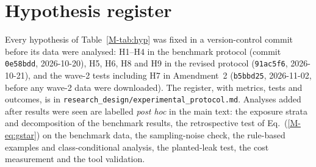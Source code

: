 \documentclass[11pt]{article}
\begin{document}
\section{Hypothesis register}\label{sec:register}
Every hypothesis of Table~\ref{M-tab:hyp} was fixed in a version-control commit before its data were analysed: H1--H4 in the benchmark protocol (commit \texttt{0e58bdd}, 2026-10-20), H5, H6, H8 and H9 in the revised protocol (\texttt{91ac5f6}, 2026-10-21), and the wave-2 tests including H7 in Amendment~2 (\texttt{b5bbd25}, 2026-11-02, before any wave-2 data were downloaded). The register, with metrics, tests and outcomes, is in \texttt{research\_design/experimental\_protocol.md}. Analyses added after results were seen are labelled \emph{post hoc} in the main text: the exposure strata and decomposition of the benchmark results, the retrospective test of Eq.~(\ref{M-eq:gstar}) on the benchmark data, the sampling-noise check, the rule-based examples and class-conditional analysis, the planted-leak test, the cost measurement and the tool validation.
\end{document}
